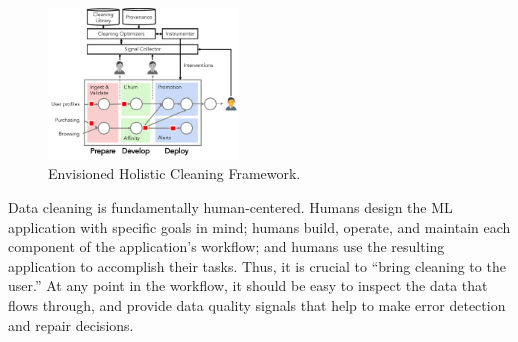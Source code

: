 \documentclass[11pt,dvipsnames]{article}
\begin{document}
\begin{figure}
	\centering
	\includegraphics[width={0.45\textwidth}]{submissions/cleaning-for-ml/images/arch-1-17.pdf}
	\caption{Envisioned Holistic Cleaning Framework.}
	\label{figure:workflow}
\end{figure}
Data cleaning is fundamentally human-centered.  Humans design the ML application with specific goals in mind; humans build, operate, and maintain each component of the application's workflow; and humans use the resulting application to accomplish their tasks.  Thus, it is crucial to ``bring cleaning to the user.''  At any point in the workflow, it should be easy to inspect the data that flows through, and provide data quality signals that help to make error detection and repair decisions.
\end{document}
